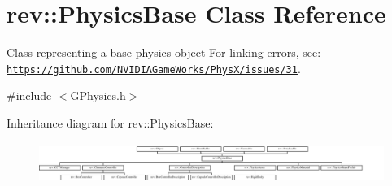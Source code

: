 \hypertarget{classrev_1_1_physics_base}{}\section{rev\+::Physics\+Base Class Reference}
\label{classrev_1_1_physics_base}


\mbox{\hyperlink{struct_class}{Class}} representing a base physics object For linking errors, see\+: \href{https://github.com/NVIDIAGameWorks/PhysX/issues/31}{\texttt{ https\+://github.\+com/\+N\+V\+I\+D\+I\+A\+Game\+Works/\+Phys\+X/issues/31}}.  




{\ttfamily \#include $<$G\+Physics.\+h$>$}

Inheritance diagram for rev\+::Physics\+Base\+:\begin{figure}[H]
\begin{center}
\leavevmode
\includegraphics[height=1.327014cm]{classrev_1_1_physics_base}
\end{center}
\end{figure}
